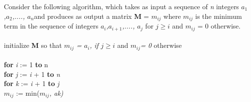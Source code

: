 \documentclass{article}
\begin{document}
Consider the following algorithm, which takes as input a sequence of \emph{n} integers \emph{$a_{1}$,$a_{2}$,...., $a_{n}$}and produces as output a matrix \textbf{M} = {$m_{ij}$} where \emph{{$m_{ij}$}} is the minimum term in the sequence of integers \emph{$a_{i}$,$a_{i+1}$,...., $a_{j}$} for \emph {$j \geq i$} and \emph {$m_{ij}$} = 0 otherwise. \\ \\ \indent initialize \textbf {M} so that \emph{{$m_{ij}$} = $a_{i}$, if $j \geq i$} and \emph{ $m_{ij}$= 0 }otherwise \\ \\ \indent \textbf{for} \emph{i} := 1 \textbf {to} n \\ 
\indent \indent \textbf {for} \emph{j} := \emph {i} + 1 \textbf{to} \emph{n} \\ 
\indent \indent \indent \textbf {for} \emph{k} := \emph {i} + 1 \textbf{to} \emph{j} \\ 
\indent \indent \indent \indent \emph{{$m_{ij}$}} := min(\emph{{$m_{ij}$}, ak)} \\ \\ 
\end{document}
